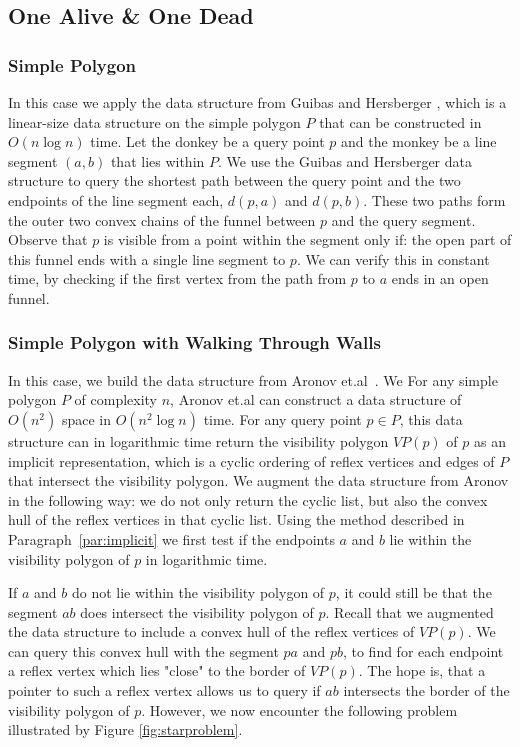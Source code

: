 \documentclass{article}
\newcommand{\etal}{et.al\xspace}
\begin{document}
\subsection{One Alive \& One Dead}

\subsubsection{Simple Polygon}

In this case we apply the data structure from Guibas and Hersberger \cite{GUIBAS1989126}, which is a linear-size data structure on the simple polygon $P$ that can be constructed in $O(n \log n)$ time. Let the donkey be a query point $p$ and the monkey be a line segment $(a,b)$ that lies within $P$. We use the Guibas and Hersberger data structure to query the shortest path between the query point and the two endpoints of the line segment each, $d(p, a)$ and $d(p, b)$. These two paths form the outer two convex chains of the funnel between $p$ and the query segment. Observe that $p$ is visible from a point within the segment only if: the open part of this funnel ends with a single line segment to $p$. We can verify this in constant time, by checking if the first vertex from the path from $p$ to $a$ ends in an open funnel.


\subsubsection{Simple Polygon with Walking Through Walls}

In this case, we build the data structure from Aronov \etal~\cite{Aronov2002}. We  For any simple polygon $P$ of complexity $n$, Aronov \etal can construct a data structure of $O(n^2)$ space in $O(n^2 \log n)$ time. For any query point $p \in P$, this data structure can in logarithmic time return the visibility polygon $VP(p)$ of $p$ as an implicit representation, which is a cyclic ordering of reflex vertices and edges of $P$ that intersect the visibility polygon. We augment the data structure from Aronov in the following way: we do not only return the cyclic list, but also the convex hull of the reflex vertices in that cyclic list. Using the method described in Paragraph~\ref{par:implicit} we first test if the endpoints $a$ and $b$ lie within the visibility polygon of $p$ in logarithmic time.


If $a$ and $b$ do not lie within the visibility polygon of $p$, it could still be that the segment $ab$ does intersect the visibility polygon of $p$. Recall that we augmented the data structure to include a convex hull of the reflex vertices of $VP(p)$. We can query this convex hull with the segment $pa$ and $pb$, to find for each endpoint a reflex vertex which lies "close" to the border of $VP(p)$. The hope is, that a pointer to such a reflex vertex allows us to query if $ab$ intersects the border of the visibility polygon of $p$. However, we now encounter the following problem illustrated by Figure \ref{fig:starproblem}.
\end{document}
